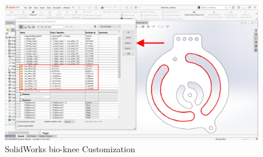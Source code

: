 \begin{figure}[hbt!]
    \centering
    \includegraphics[width=\textwidth]{images/appendix/solidworks_customization.png}
    \caption{SolidWorks bio-knee Customization}
    \label{fig:SolidWorksbiokneeCustomization}
\end{figure}






